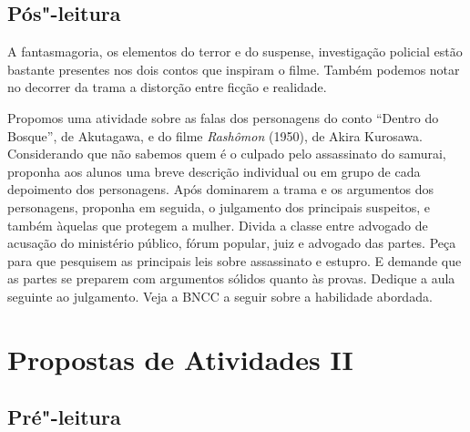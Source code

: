 \documentclass[12pt]{extarticle}
\begin{document}
\subsection{Pós"-leitura}




A fantasmagoria, os elementos do terror e do suspense, investigação policial
estão bastante presentes nos dois contos que inspiram o filme.
Também podemos notar no decorrer da trama a distorção entre ficção e realidade. 

Propomos uma atividade sobre as falas dos personagens do conto  ``Dentro do Bosque'', de Akutagawa, 
e do filme \emph{Rashômon} (1950), de Akira Kurosawa. 
Considerando que não sabemos quem é o culpado pelo assassinato do samurai, 
proponha aos alunos uma breve descrição
individual ou em grupo de cada depoimento dos personagens. Após dominarem 
a trama e os argumentos dos personagens, proponha em seguida, o julgamento dos 
principais suspeitos, e também àquelas que protegem a mulher. Divida a classe
entre advogado de acusação do ministério público, fórum popular, juiz e advogado das partes.
Peça para que pesquisem as principais leis sobre assassinato e estupro. E demande
que as partes se preparem com argumentos sólidos quanto às provas. Dedique a aula seguinte 
ao julgamento. 
Veja a BNCC a seguir sobre a habilidade abordada. 



\section{Propostas de Atividades II}





\subsection{Pré"-leitura}
\end{document}
